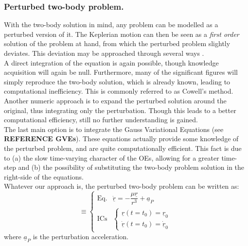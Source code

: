 			\subsubsection{Perturbed two-body problem.}
			\indent With the two-body solution in mind, any problem can be modelled as a perturbed version of it. The Keplerian motion can then be seen as a \textit{first order} solution of the problem at hand, from which the perturbed problem slightly deviates. This deviation may be approached through several ways \cite{Wiesel}. \\
			\indent A direct integration of the equation is again possible, though knowledge acquisition will again be null. Furthermore, many of the significant figures will simply reproduce the two-body solution, which is already known, leading to computational inefficiency. This is commonly referred to as Cowell's method. \\
			\indent Another numeric approach is to expand the perturbed solution around the original, thus integrating only the perturbation. Though this leads to a better computational efficiency, still no further understanding is gained. \\
			\indent The last main option is to integrate the Gauss Variational Equations (see \textbf{REFERENCE GVEs}). These equations actually provide some knowledge of the perturbed problem, and are quite computationally efficient. This fact is due to (a) the slow time-varying character of the OEs, allowing for a greater time-step and (b) the possibility of substituting the two-body problem solution in the right-side of the equations. \\
			\indent Whatever our approach is, the perturbed two-body problem can be written as:
			\begin{equation}
			[P]\equiv\left\{ \begin{array}{lcc}
			\text{Eq.} &  \ddot{\underline{r}} = -\dfrac{\mu \underline{r}}{r^3} + \underline{a}_P\\[1em]
			\text{ICs} & \left\{ \begin{array}{ll}
			\underline{r} (t = t_0) = \underline{r}_{0} \\
			\dot{\underline{r}} (t = t_0) = \dot{\underline{r}}_{0} 
			\end{array}\right.
			\end{array}\right.
			\label{eqCh2:2BP_pert}
			\end{equation}
			\noindent where $\underline{a}_P$ is the perturbation acceleration.
